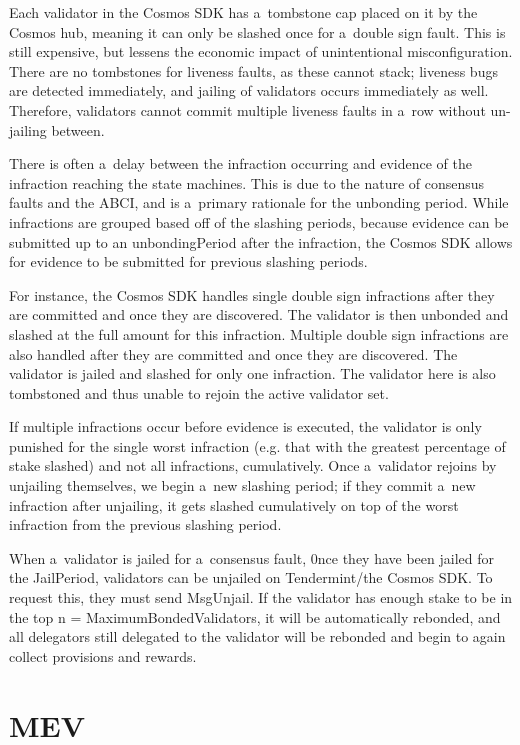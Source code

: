 \documentclass[sigplan,screen,authorversion]{acmart}
\begin{document}
Each validator in the Cosmos SDK has a~tombstone cap placed on it by
the Cosmos hub, meaning it can only be slashed once for a~double sign
fault. This is still expensive, but lessens the economic impact of
unintentional misconfiguration. There are no tombstones for liveness
faults, as these cannot stack; liveness bugs are detected immediately,
and jailing of validators occurs immediately as well. Therefore,
validators cannot commit multiple liveness faults in a~row without
un-jailing between.

There is often a~delay between the infraction occurring and evidence
of the infraction reaching the state machines. This is due to the
nature of consensus faults and the ABCI, and is a~primary rationale
for the unbonding period. While infractions are grouped based off of
the slashing periods, because evidence can be submitted up to an
unbondingPeriod after the infraction, the Cosmos SDK allows for
evidence to be submitted for previous slashing periods.

For instance, the Cosmos SDK handles single double sign infractions
after they are committed and once they are discovered. The validator
is then unbonded and slashed at the full amount for this
infraction. Multiple double sign infractions are also handled after
they are committed and once they are discovered. The validator is
jailed and slashed for only one infraction. The validator here is also
tombstoned and thus unable to rejoin the active validator set.

If multiple infractions occur before evidence is executed, the
validator is only punished for the single worst infraction (e.g. that
with the greatest percentage of stake slashed) and not all
infractions, cumulatively. Once a~validator rejoins by unjailing
themselves, we begin a~new slashing period; if they commit a~new
infraction after unjailing, it gets slashed cumulatively on top of the
worst infraction from the previous slashing period.

When a~validator is jailed for a~consensus fault, 0nce they have been
jailed for the JailPeriod, validators can be unjailed on
Tendermint/the Cosmos SDK. To request this, they must send
MsgUnjail. If the validator has enough stake to be in the top n =
MaximumBondedValidators, it will be automatically rebonded, and all
delegators still delegated to the validator will be rebonded and begin
to again collect provisions and rewards.

\section{MEV}
\end{document}
